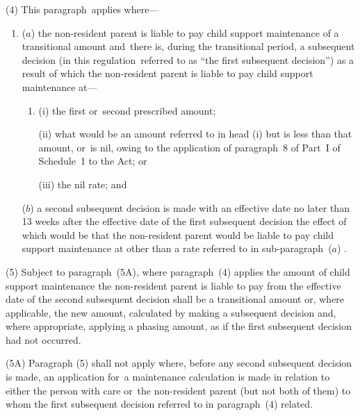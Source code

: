 \documentclass[12pt,a4paper]{article}
\begin{document}
(4) This paragraph~applies where—
\begin{enumerate}\item[]
($a$) the non-resident parent is liable to pay child support maintenance of a transitional amount and~there is, during the transitional period, a subsequent decision (in this regulation~referred to as “the first subsequent decision”) as a result of which the non-resident parent is liable to pay child support maintenance 
at—
\begin{enumerate}\item[]
    (i) 
    the first or~second prescribed amount;

    (ii) 
    what would be an amount referred to in head (i)  but is less than that amount, or~is nil, owing to the application of paragraph~8 of Part~I of Schedule~1 to the Act; or

    (iii) 
    the nil rate; and~
\end{enumerate}  %

($b$) a second subsequent decision is made with an effective date no later than 13 weeks after the effective date of the first subsequent decision the effect of which would be that the non-resident parent would be liable to pay child support maintenance at other than 
a rate referred to in sub-paragraph~($a$)%
.
\end{enumerate}

(5) 
Subject to paragraph~(5A), where  %
paragraph~(4) applies the amount of child support maintenance the non-resident parent is liable to pay from the effective date of the second subsequent decision shall be a transitional amount or, where applicable, the new amount, calculated by making a subsequent decision and, where appropriate, applying a phasing amount, as if the first subsequent decision had not occurred.

(5A) Paragraph (5) shall not apply where, before any second subsequent decision is made, an application for~a maintenance calculation is made 
in relation to either the person with care or~the non-resident parent (but not both of them) to whom the first subsequent decision referred to in paragraph~(4) related.
\end{document}
